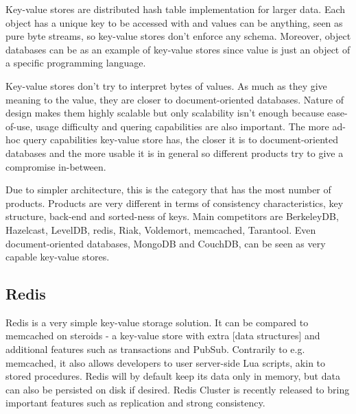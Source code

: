 Key-value stores are distributed hash table implementation for larger data.
Each object has a unique key to be accessed with and values can be anything, seen as pure byte streams, so key-value stores don't enforce any schema.
Moreover, object databases can be as an example of key-value stores since value is just an object of a specific programming language.

Key-value stores don't try to interpret bytes of values.
As much as they give meaning to the value, they are closer to document-oriented databases.
Nature of design makes them highly scalable but only scalability isn't enough because ease-of-use, usage difficulty and quering capabilities are also important.
The more ad-hoc query capabilities key-value store has, the closer it is to document-oriented databases and the more usable it is in general so different products try to give a compromise in-between.

Due to simpler architecture, this is the category that has the most number of products.
Products are very different in terms of consistency characteristics, key structure, back-end and sorted-ness of keys. Main competitors are BerkeleyDB, Hazelcast, LevelDB, redis, Riak, Voldemort, memcached, Tarantool. Even document-oriented databases, MongoDB and CouchDB, can be seen as very capable key-value stores.

\subsection{Redis}

Redis is a very simple key-value storage solution. It can be compared to memcached on steroids - a key-value store with extra [data structures] and additional features such as transactions and PubSub. Contrarily to e.g. memcached, it also allows developers to user server-side Lua scripts, akin to stored procedures. Redis will by default keep its data only in memory, but data can also be persisted on disk if desired. Redis Cluster is recently released to bring important features such as replication and strong consistency.

